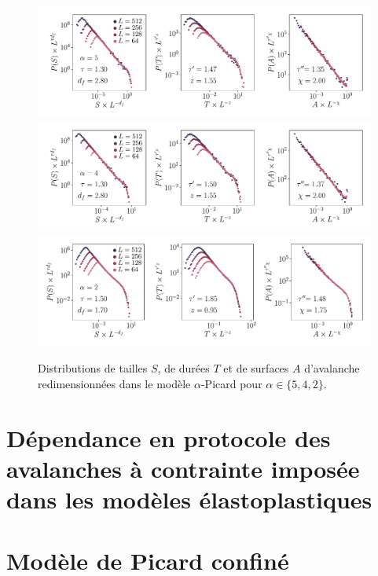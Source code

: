 \begin{figure}[H]
	\centering
	\includegraphics[width=\textwidth]{Chapitre4/Figures/Avalanches/Rescale_Av_alpha5.pdf}
	\includegraphics[width=\textwidth]{Chapitre4/Figures/Avalanches/Rescale_Av_alpha4.pdf}
	\includegraphics[width=\textwidth]{Chapitre4/Figures/Avalanches/Rescale_Av_alpha2.pdf}
	\caption{Distributions de tailles $S$, de durées $T$ et de surfaces $A$ d'avalanche redimensionnées dans le modèle $\alpha$-Picard pour $\alpha \in \{5, 4, 2 \}$.}
	\label{fig:Av_rescale_alpha_annexe}
\end{figure}

\section{Dépendance en protocole des avalanches à contrainte imposée dans les modèles élastoplastiques}

\label{sec:article2}



\section{Modèle de Picard confiné}

